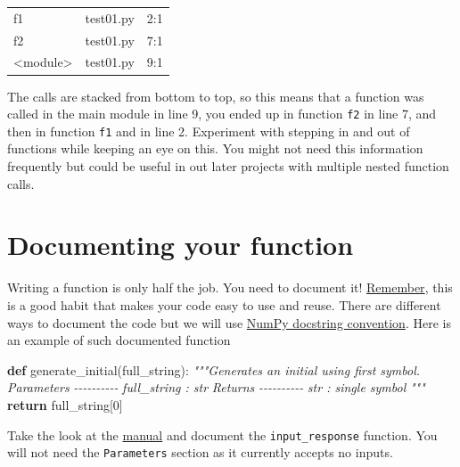 \documentclass[
]{book}
\newenvironment{Shaded}{\begin{snugshade}}{\end{snugshade}}
\newcommand{\CommentTok}[1]{\textcolor[rgb]{0.56,0.35,0.01}{\textit{#1}}}
\newcommand{\ControlFlowTok}[1]{\textcolor[rgb]{0.13,0.29,0.53}{\textbf{#1}}}
\newcommand{\DecValTok}[1]{\textcolor[rgb]{0.00,0.00,0.81}{#1}}
\newcommand{\KeywordTok}[1]{\textcolor[rgb]{0.13,0.29,0.53}{\textbf{#1}}}
\newcommand{\NormalTok}[1]{#1}
\begin{document}
\begin{longtable}[]{@{}lll@{}}
\toprule
\endhead
f1 & test01.py & 2:1 \\
f2 & test01.py & 7:1 \\
\textless module\textgreater{} & test01.py & 9:1 \\
\bottomrule
\end{longtable}

The calls are stacked from bottom to top, so this means that a function was called in the main module in line 9, you ended up in function \texttt{f2} in line 7, and then in function \texttt{f1} and in line 2. Experiment with stepping in and out of functions while keeping an eye on this. You might not need this information frequently but could be useful in out later projects with multiple nested function calls.

\hypertarget{numpy-docstring}{%
\section{Documenting your function}\label{numpy-docstring}}

Writing a function is only half the job. You need to document it! \protect\hyperlink{programming-tips}{Remember}, this is a good habit that makes your code easy to use and reuse. There are different ways to document the code but we will use \href{https://numpydoc.readthedocs.io/en/latest/format.html\#docstring-standard}{NumPy docstring convention}. Here is an example of such documented function

\begin{Shaded}
\begin{Highlighting}[]
\KeywordTok{def}\NormalTok{ generate\_initial(full\_string):}
    \CommentTok{"""Generates an initial using first symbol.}
\CommentTok{    }
\CommentTok{    Parameters}
\CommentTok{    {-}{-}{-}{-}{-}{-}{-}{-}{-}{-}}
\CommentTok{    full\_string : str}
\CommentTok{    }
\CommentTok{    Returns}
\CommentTok{    {-}{-}{-}{-}{-}{-}{-}{-}{-}{-}}
\CommentTok{    str : single symbol}
\CommentTok{    """}
    \ControlFlowTok{return}\NormalTok{ full\_string[}\DecValTok{0}\NormalTok{]}
\end{Highlighting}
\end{Shaded}

Take the look at the \href{https://numpydoc.readthedocs.io/en/latest/format.html\#docstring-standard}{manual} and document the \texttt{input\_response} function. You will not need the \texttt{Parameters} section as it currently accepts no inputs.
\end{document}
